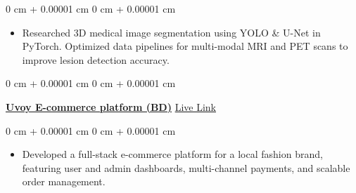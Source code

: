 \documentclass[10pt, letterpaper]{article}
\newenvironment{highlights}{
    \begin{itemize}[
        topsep=0.10 cm,
        parsep=0.10 cm,
        partopsep=0pt,
        itemsep=0pt,
        leftmargin=0 cm + 10pt
    ]
}{
    \end{itemize}
} %
\newenvironment{onecolentry}{
    \begin{adjustwidth}{
        0 cm + 0.00001 cm
    }{
        0 cm + 0.00001 cm
    }
}{
    \end{adjustwidth}
} %
\newenvironment{twocolentry}[2][]{
    \onecolentry
    \def\secondColumn{#2}
    \setcolumnwidth{\fill, 4.5 cm}
    \begin{paracol}{2}
}{
    \switchcolumn \raggedleft \secondColumn
    \end{paracol}
    \endonecolentry
} %
\begin{document}
        \vspace{0.10 cm}
        \begin{onecolentry}
            \begin{highlights}
               \item Researched 3D medical image segmentation using YOLO \& U-Net in PyTorch. Optimized data pipelines for multi-modal MRI and PET scans to improve lesion detection accuracy.
            \end{highlights}
        \end{onecolentry}



        
        \begin{twocolentry}{
            \href{https://www.uvoystore.com/}{Live Link}
        }
         \vspace{0.2 cm}
            \href{https://www.uvoystore.com/}{\textbf{Uvoy E-commerce platform (BD)}}\end{twocolentry}

        \vspace{0.10 cm}
        \begin{onecolentry}
            \begin{highlights}

                \item Developed a full-stack e-commerce platform for a local fashion brand, featuring user and admin dashboards, multi-channel payments, and scalable order management.
            \end{highlights}

        
            
        \end{onecolentry}
\end{document}
